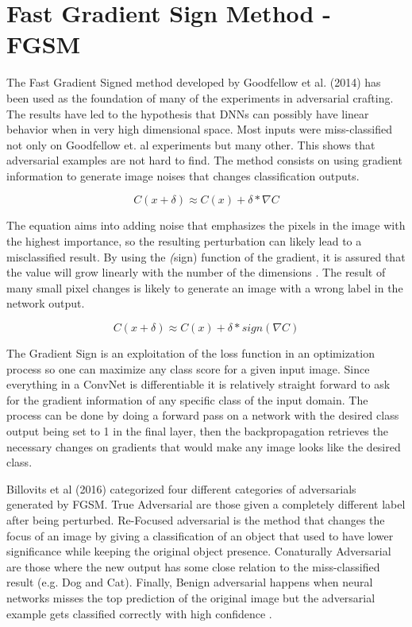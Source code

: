 \section{Fast Gradient Sign Method - FGSM}

The Fast Gradient Signed method developed by Goodfellow et al. (2014) has been used as the foundation of many of the experiments in adversarial crafting. The results have led to the hypothesis that DNNs can possibly have linear behavior when in very high dimensional space.  Most inputs were miss-classified not only on Goodfellow et. al \cite{goodfellow2014}  experiments but many other. This shows that adversarial examples are not hard to find. The method consists on using gradient information to generate image noises that changes classification outputs.

$$ C(x + \delta)\approx C(x) + \delta * \nabla C$$

The equation aims into adding noise that emphasizes the pixels in the image with the highest importance, so the resulting perturbation can likely lead to a misclassified result. By using the \textit(sign) function of the gradient, it is assured that the value will grow linearly with the number of the dimensions \cite{goodfellow2014}. The result of many small pixel changes is likely to generate an image with a wrong label in the network output.

$$ C(x + \delta)\approx C(x) + \delta * sign(\nabla C)$$

The Gradient Sign is an exploitation of the loss function in an optimization process so one can maximize any class score for a given input image. Since everything in a ConvNet is differentiable it is relatively straight forward to ask for the gradient information of any specific class of the input domain. The process can be done by doing a forward pass on a network with the desired class output being set to 1 in the final layer, then the backpropagation retrieves the necessary changes on gradients that would make any image looks like the desired class. 

Billovits et al (2016) categorized four different categories of adversarials generated by FGSM. True Adversarial are those given a completely different label after being perturbed. Re-Focused adversarial is the method that changes the focus of an image by giving a classification of an object that used to have lower significance while keeping the original object presence. Conaturally Adversarial are those where the new output has some close relation to the miss-classified result (e.g. Dog and Cat). Finally, Benign adversarial happens when neural networks misses the top prediction of the original image but the adversarial example gets classified correctly with high confidence \cite{billovits}.

